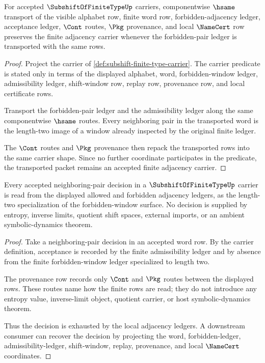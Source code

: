 \begin{theorem}
\label{thm:subshift-finite-type-adjacency-carrier-transport}
For accepted $\SubshiftOfFiniteTypeUp$ carriers, componentwise $\hsame$ transport of the visible alphabet row, finite word row, forbidden-adjacency ledger, acceptance ledger, $\Cont$ routes, $\Pkg$ provenance, and local $\NameCert$ row preserves the finite adjacency carrier whenever the forbidden-pair ledger is transported with the same rows.
\end{theorem}
\begin{proof}
Project the carrier of \autoref{def:subshift-finite-type-carrier}. The carrier predicate is stated only in terms of the displayed alphabet, word, forbidden-window ledger, admissibility ledger, shift-window row, replay row, provenance row, and local certificate rows.

Transport the forbidden-pair ledger and the admissibility ledger along the same componentwise $\hsame$ routes. Every neighboring pair in the transported word is the length-two image of a window already inspected by the original finite ledger.

The $\Cont$ routes and $\Pkg$ provenance then repack the transported rows into the same carrier shape. Since no further coordinate participates in the predicate, the transported packet remains an accepted finite adjacency carrier.
\end{proof}

\begin{theorem}
\label{thm:subshift-finite-type-forbidden-word-ledger-exhaustion}
Every accepted neighboring-pair decision in a $\SubshiftOfFiniteTypeUp$ carrier is read from the displayed allowed and forbidden adjacency ledgers, as the length-two specialization of the forbidden-window surface. No decision is supplied by entropy, inverse limits, quotient shift spaces, external imports, or an ambient symbolic-dynamics theorem.
\end{theorem}
\begin{proof}
Take a neighboring-pair decision in an accepted word row. By the carrier definition, acceptance is recorded by the finite admissibility ledger and by absence from the finite forbidden-window ledger specialized to length two.

The provenance row records only $\Cont$ and $\Pkg$ routes between the displayed rows. These routes name how the finite rows are read; they do not introduce any entropy value, inverse-limit object, quotient carrier, or host symbolic-dynamics theorem.

Thus the decision is exhausted by the local adjacency ledgers. A downstream consumer can recover the decision by projecting the word, forbidden-ledger, admissibility-ledger, shift-window, replay, provenance, and local $\NameCert$ coordinates.
\end{proof}


